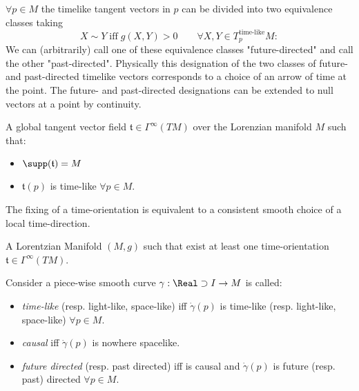 \documentclass[Main]{subfiles}
\begin{document}
	\begin{observation}
		$\forall p\in M$ the timelike tangent vectors in $p$ can be divided into two equivalence classes taking
		\begin{displaymath}
			X \sim Y \; \textrm{iff} \; g(X,Y)>0 \qquad \forall X,Y \in T^\textrm{time-like}_pM:
		\end{displaymath}
		We can (arbitrarily) call one of these equivalence classes "future-directed" and call the other "past-directed". Physically this designation of the two classes of future- and past-directed timelike vectors corresponds to a choice of an arrow of time at the point. The future- and past-directed designations can be extended to null vectors at a point by continuity.
	\end{observation}
	
	\begin{definition}
		A global tangent vector field  $\mathfrak{t}\in \Gamma^\infty(TM)$ over the Lorenzian manifold $M$ such that:
		\begin{itemize}
			\item $\supp(\mathfrak{t}) = M$
			\item $\mathfrak{t}(p)$ is time-like $\forall p \in M$.
		\end{itemize}
	\end{definition}
	\begin{observation}
		The fixing of a time-orientation is equivalent to a consistent smooth choice of a local time-direction.
	\end{observation}	
	
	\begin{definition}
		A Lorentzian Manifold $(M,g)$ such that exist at least one time-orientation $\mathfrak{t}\in \Gamma^\infty(TM)$.
	\end{definition}

	\begin{notationfix}
		Consider a piece-wise smooth curve $\gamma: \Real\supset I \rightarrow M$ is called:
		\begin{itemize}
			\item \emph{time-like} (resp. light-like, space-like) iff $\dot{\gamma}(p)$ is time-like (resp. light-like, space-like) $\forall p \in M$.
			\item \emph{causal} iff $\dot{\gamma}(p)$ is nowhere spacelike.
			\item \emph{future directed} (resp. past directed) iff is causal and  $\dot{\gamma}(p)$ is future (resp. past) directed $\forall p \in M$.
		\end{itemize}
	\end{notationfix}
\end{document}
